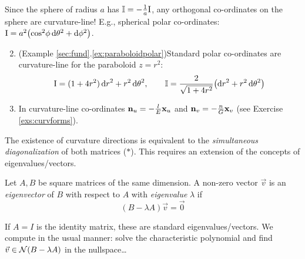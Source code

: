 \begin{examples}{}{}
	\exstart Since the sphere of radius $a$ has $\mathbb{I}=-\frac 1a\mathrm{I}$, any orthogonal co-ordinates on the sphere are curvature-line! E.g., spherical polar co-ordinates: $\mathrm{I}=a^2\bigl(\cos^2\!\phi\,\mathrm{d}\theta^2+\mathrm{d}\phi^2\bigr)$.
	\begin{enumerate}\setcounter{enumi}{1}
	  \item (Example \ref*{sec:fund}.\ref{ex:paraboloidpolar})\lstsp Standard polar co-ordinates are curvature-line for the paraboloid $z=r^2$:
	  \[
	  	\mathrm{I}=(1+4r^2)\,{\mathrm{d} r}^2+r^2\,{\mathrm{d}\theta}^2, \qquad \mathbb{I}=\frac{2}{\sqrt{1+4r^2}}\big({\mathrm{d} r}^2+r^2\,{\mathrm{d}\theta}^2\bigr)
	  \]
	  \item In curvature-line co-ordinates ${\mathbf{n}}_u=-\frac lE{\mathbf{x}}_u$ and ${\mathbf{n}}_v=-\frac nG{\mathbf{x}}_v$ (see Exercise \ref{exs:curvforms}).
	\end{enumerate}
\end{examples}




The existence of curvature directions is equivalent to the \emph{simultaneous diagonalization} of both matrices ($\ast$). This requires an extension of the concepts of eigenvalues/vectors.


\begin{defn}{}{}
	Let $A,B$ be square matrices of the same dimension. A non-zero vector $\vec v$ is an \emph{eigenvector} of $B$ with respect to $A$ with \emph{eigenvalue} $\lambda$ if
	\[
		(B-\lambda A)\vec v=\vec 0
	\]
\end{defn}

If $A=I$ is the identity matrix, these are standard eigenvalues/vectors. We compute in the usual manner: solve the characteristic polynomial and find $\vec v\in\mathcal{N}(B-\lambda A)$ in the nullspace\ldots

\goodbreak

